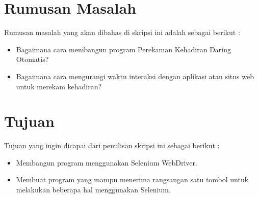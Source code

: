 \documentclass[a4paper,twoside]{article}
\begin{document}
\section{Rumusan Masalah}
Rumusan masalah yang akan dibahas di skripsi ini adalah sebagai berikut :
\begin{itemize}
	\item Bagaimana cara membangun program Perekaman Kehadiran Daring Otomatis?
	\item Bagaimana cara mengurangi waktu interaksi dengan aplikasi atau situs web untuk merekam kehadiran?
\end{itemize}

\section{Tujuan}
Tujuan yang ingin dicapai dari penulisan skripsi ini sebagai berikut :
\begin{itemize}
	\item Membangun program menggunakan Selenium WebDriver.
	\item Membuat program yang mampu menerima rangsangan satu tombol untuk melakukan beberapa hal menggunakan Selenium.
\end{itemize}
\end{document}
